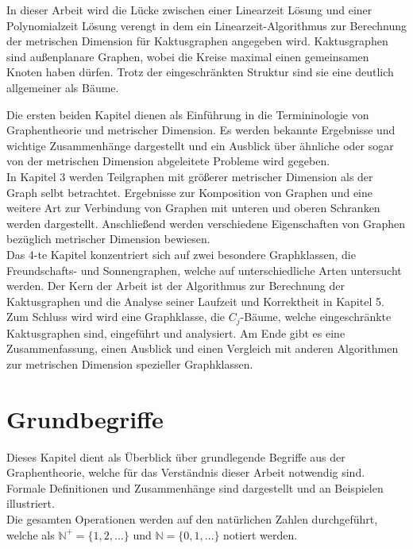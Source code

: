 In dieser Arbeit wird die Lücke zwischen einer Linearzeit Lösung und einer Polynomialzeit Lösung verengt in dem ein Linearzeit-Algorithmus zur Berechnung der metrischen Dimension für Kaktusgraphen angegeben wird. Kaktusgraphen sind außenplanare Graphen, wobei die Kreise maximal einen gemeinsamen Knoten haben dürfen. Trotz der eingeschränkten Struktur sind sie eine deutlich allgemeiner als Bäume.\newline\newline

Die ersten beiden Kapitel dienen als Einführung in die Termininologie von Graphentheorie und metrischer Dimension. Es werden bekannte Ergebnisse und wichtige Zusammenhänge dargestellt und ein Ausblick über ähnliche oder sogar von der metrischen Dimension abgeleitete Probleme wird gegeben.\\In Kapitel 3 werden Teilgraphen mit größerer metrischer Dimension als der Graph selbt betrachtet. Ergebnisse zur Komposition von Graphen und eine weitere Art zur Verbindung von Graphen mit unteren und oberen Schranken werden dargestellt. Anschließend werden verschiedene Eigenschaften von Graphen bezüglich metrischer Dimension bewiesen.\\ 
Das 4-te Kapitel konzentriert sich auf zwei besondere Graphklassen, die Freundschafts- und Sonnengraphen, welche auf unterschiedliche Arten untersucht werden. Der Kern der Arbeit ist der Algorithmus zur Berechnung der Kaktusgraphen und die Analyse seiner Laufzeit und Korrektheit in Kapitel 5.\\Zum Schluss wird wird eine Graphklasse, die $C_j$-Bäume, welche eingeschränkte Kaktusgraphen sind, eingeführt und analysiert. Am Ende gibt es eine Zusammenfassung, einen Ausblick und einen Vergleich mit anderen Algorithmen zur metrischen Dimension spezieller Graphklassen.
\chapter{Grundbegriffe}
Dieses Kapitel dient als Überblick über grundlegende Begriffe aus der Graphentheorie, welche für das Verständnis dieser Arbeit notwendig sind. Formale Definitionen und Zusammenhänge sind dargestellt und an Beispielen illustriert.%
\\
Die gesamten Operationen werden auf den natürlichen Zahlen durchgeführt, welche als $\mathbb{N}^+=\{1,2,\ldots\}$ und $\mathbb{N}=\{0,1,\ldots\}$ notiert werden.
